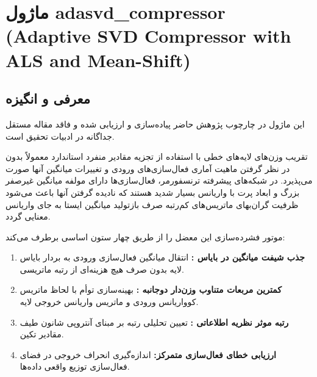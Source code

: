 \section{ماژول adasvd\_compressor (Adaptive SVD Compressor with ALS and Mean-Shift)}
\label{sec:module_adasvd_compressor}

\subsection{معرفی و انگیزه}
این ماژول در چارچوب پژوهش حاضر پیاده‌سازی و ارزیابی شده و فاقد مقاله مستقل جداگانه در ادبیات تحقیق است.

تقریب وزن‌های لایه‌های خطی با استفاده از تجزیه مقادیر منفرد  استاندارد معمولاً بدون در نظر گرفتن ماهیت آماری فعال‌سازی‌های ورودی و تغییرات میانگین آنها صورت می‌پذیرد. در شبکه‌های پیشرفته ترنسفورمر، فعال‌سازی‌ها دارای مولفه میانگین غیرصفر بزرگ  و ابعاد پرت با واریانس بسیار شدید هستند که نادیده گرفتن آنها باعث می‌شود ظرفیت گران‌بهای ماتریس‌های کم‌رتبه صرف بازتولید میانگین ایستا به جای واریانس معنایی گردد.

موتور فشرده‌سازی  این معضل را از طریق چهار ستون اساسی برطرف می‌کند:
\begin{enumerate}
\item \textbf{جذب شیفت میانگین در بایاس :} انتقال میانگین فعال‌سازی ورودی به بردار بایاس لایه بدون صرف هیچ هزینه‌ای از رتبه ماتریسی.
\item \textbf{کمترین مربعات متناوب وزن‌دار دوجانبه :} بهینه‌سازی توأم با لحاظ ماتریس کوواریانس ورودی و ماتریس واریانس خروجی لایه.
\item \textbf{رتبه موثر نظریه اطلاعاتی :} تعیین تحلیلی رتبه بر مبنای آنتروپی شانون طیف مقادیر تکین.
\item \textbf{ارزیابی خطای فعال‌سازی متمرکز:} اندازه‌گیری انحراف خروجی در فضای فعال‌سازی توزیع واقعی داده‌ها.
\end{enumerate}

